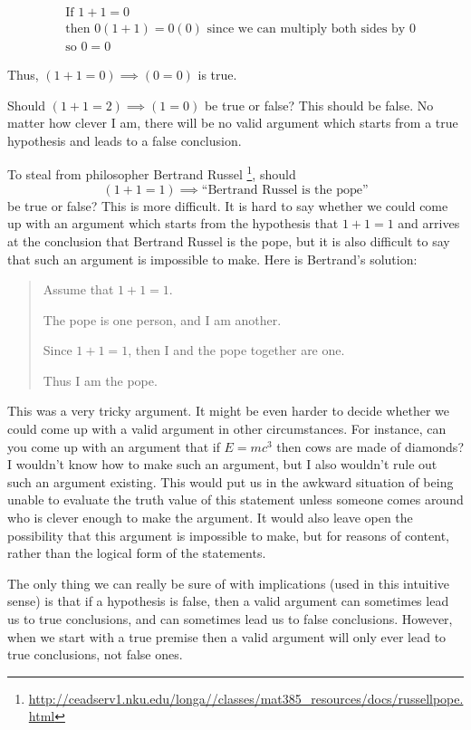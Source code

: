 \begin{align*}
	&\textrm{If } 1+1 = 0 \\
	&\textrm{then } 0(1+1)  = 0(0) \textrm{ since we can multiply both sides by $0$}\\
	&\textrm{so } 0=0 
\end{align*}

Thus, $(1+1 = 0) \implies (0 = 0)$ is true.

Should $(1+1 = 2) \implies (1 = 0)$ be true or false?  This should be false.  No matter how clever I am, there will be no valid argument which starts from a true hypothesis and leads to a false conclusion.

To steal from philosopher Bertrand Russel \footnote{\url{http://ceadserv1.nku.edu/longa//classes/mat385_resources/docs/russellpope.html}}, should  $$(1+1 = 1) \implies \textrm{``Bertrand Russel is the pope''}$$ be true or false?  This is more difficult.  It is hard to say whether we could come up with an argument which starts from the hypothesis that $1+1 = 1$ and arrives at the conclusion that Bertrand Russel is the pope, but it is also difficult to say that such an argument is impossible to make.  Here is Bertrand's solution:

\begin{quote}
		Assume that $1+1 = 1$.
		
		The pope is one person, and I am another.
		
		Since $1+1 = 1$, then I and the pope together are one.
		
		Thus I am the pope.
	\end{quote}

This was a very tricky argument.  It might be even harder to decide whether we could come up with a valid argument in other circumstances.  For instance, can you come up with an argument that if $E = mc^3$ then cows are made of diamonds?  I wouldn't know how to make such an argument, but I also wouldn't rule out such an argument existing.  This would put us in the awkward situation of being unable to evaluate the truth value of this statement unless someone comes around who is clever enough to make the argument.  It would also leave open the possibility that this argument is impossible to make, but for reasons of content, rather than the logical form of the statements.

The only thing we can really be sure of with implications (used in this intuitive sense) is that if a hypothesis is false, then a valid argument can sometimes lead us to true conclusions, and can sometimes lead us to false conclusions.  However, when we start with a true premise then a valid argument will only ever lead to true conclusions, not false ones.

